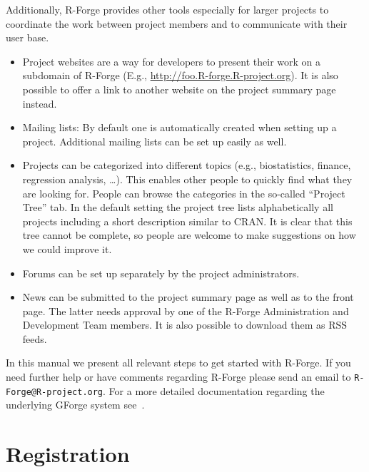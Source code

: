\documentclass[a4paper]{article}
\newcommand{\RFORGE}{\proglang{R}-Forge Administration and Development Team}
\let\email=\texttt
\newcommand{\proglang}[1]{\textsf{#1}}
\begin{document}
Additionally, \proglang{R}-Forge provides other tools especially for larger
projects to coordinate the work between project members and to
communicate with their user base.

\begin{itemize}
\item Project websites are a way for developers to present their work
  on a subdomain of \proglang{R}-Forge (E.g.,
  \url{http://foo.R-forge.R-project.org}). It is also possible to
  offer a link to another website on the project summary page instead. 
\item Mailing lists: By default one is automatically created when setting up a
  project. Additional mailing lists can be set up easily as well. 
\item Projects can be categorized into different
  topics (e.g., biostatistics, finance, regression analysis,
  \ldots). This enables other people to quickly find what they are
  looking for. People can browse the categories in the so-called
  ``Project Tree'' tab. In the default setting the project tree lists
  alphabetically all projects including a short description similar to
  CRAN. It is clear that this tree cannot be complete, so people are
  welcome to make suggestions on how we could improve it. 
\item Forums can be set up separately by the project
  administrators.%
\item News can be submitted to the project summary page as well as to the
  front page. The latter needs approval by one of the \RFORGE{}
  members. It is also possible to download them as RSS feeds.
\end{itemize} 


In this manual we present all relevant steps to get
started with \proglang{R}-Forge. If you need further help or have
comments regarding \proglang{R}-Forge please send an email to
\email{R-Forge@R-project.org}. For a more detailed
documentation regarding the underlying GForge system
see~\cite{forge:copeland_et_al:2006}. 

\section{Registration}
\label{sec:registration}
\end{document}
